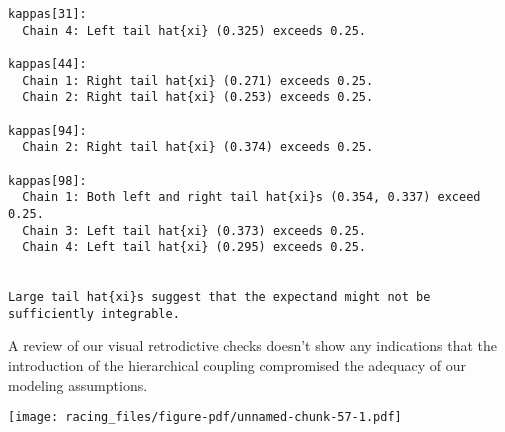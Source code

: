 \documentclass[
  letterpaper,
  DIV=11,
  numbers=noendperiod]{scrartcl}
\newenvironment{Shaded}{\begin{snugshade}}{\end{snugshade}}
\newcommand{\AttributeTok}[1]{\textcolor[rgb]{0.40,0.45,0.13}{#1}}
\newcommand{\DecValTok}[1]{\textcolor[rgb]{0.68,0.00,0.00}{#1}}
\newcommand{\FunctionTok}[1]{\textcolor[rgb]{0.28,0.35,0.67}{#1}}
\newcommand{\NormalTok}[1]{\textcolor[rgb]{0.00,0.23,0.31}{#1}}
\newcommand{\SpecialCharTok}[1]{\textcolor[rgb]{0.37,0.37,0.37}{#1}}
\newcommand{\StringTok}[1]{\textcolor[rgb]{0.13,0.47,0.30}{#1}}
\begin{document}
\begin{verbatim}
kappas[31]:
  Chain 4: Left tail hat{xi} (0.325) exceeds 0.25.

kappas[44]:
  Chain 1: Right tail hat{xi} (0.271) exceeds 0.25.
  Chain 2: Right tail hat{xi} (0.253) exceeds 0.25.

kappas[94]:
  Chain 2: Right tail hat{xi} (0.374) exceeds 0.25.

kappas[98]:
  Chain 1: Both left and right tail hat{xi}s (0.354, 0.337) exceed 0.25.
  Chain 3: Left tail hat{xi} (0.373) exceeds 0.25.
  Chain 4: Left tail hat{xi} (0.295) exceeds 0.25.


Large tail hat{xi}s suggest that the expectand might not be
sufficiently integrable.
\end{verbatim}

A review of our visual retrodictive checks doesn't show any indications
that the introduction of the hierarchical coupling compromised the
adequacy of our modeling assumptions.

\begin{Shaded}
\end{Shaded}

\texttt{[image: racing\_files/figure-pdf/unnamed-chunk-57-1.pdf]}
\end{document}
